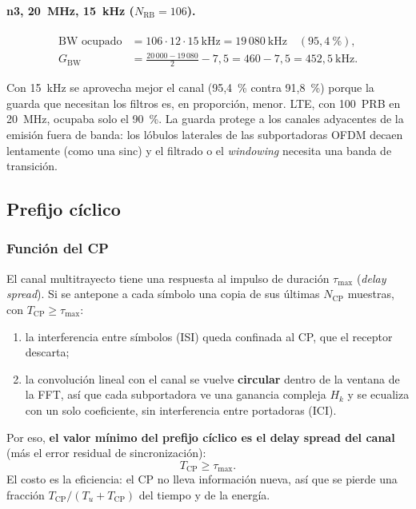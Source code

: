 \paragraph{n3, 20~MHz, 15~kHz ($N_\text{RB}=106$).}
\begin{align}
\text{BW ocupado} &= 106\cdot 12\cdot 15~\text{kHz} = 19\,080~\text{kHz} \quad (95{,}4~\%),\\
G_\text{BW} &= \frac{20\,000-19\,080}{2} - 7{,}5 = 460 - 7{,}5 = 452{,}5~\text{kHz}.
\end{align}

Con 15~kHz se aprovecha mejor el canal (95,4~\% contra 91,8~\%) porque la guarda que necesitan los filtros es, en proporción, menor. LTE, con 100~PRB en 20~MHz, ocupaba solo el 90~\%. La guarda protege a los canales adyacentes de la emisión fuera de banda: los lóbulos laterales de las subportadoras OFDM decaen lentamente (como una sinc) y el filtrado o el \emph{windowing} necesita una banda de transición.

\subsection{Prefijo cíclico}\label{sec:cp}
\subsubsection{Función del CP}
El canal multitrayecto tiene una respuesta al impulso de duración $\tau_\text{max}$ (\emph{delay spread}). Si se antepone a cada símbolo una copia de sus últimas $N_\text{CP}$ muestras, con $T_\text{CP}\ge\tau_\text{max}$:
\begin{enumerate}
  \item la interferencia entre símbolos (ISI) queda confinada al CP, que el receptor descarta;
  \item la convolución lineal con el canal se vuelve \textbf{circular} dentro de la ventana de la FFT, así que cada subportadora ve una ganancia compleja $H_k$ y se ecualiza con un solo coeficiente, sin interferencia entre portadoras (ICI).
\end{enumerate}
Por eso, \textbf{el valor mínimo del prefijo cíclico es el delay spread del canal} (más el error residual de sincronización):
\begin{equation}
T_\text{CP} \ge \tau_\text{max}.
\label{eq:cpmin}
\end{equation}
El costo es la eficiencia: el CP no lleva información nueva, así que se pierde una fracción $T_\text{CP}/(T_u + T_\text{CP})$ del tiempo y de la energía.

